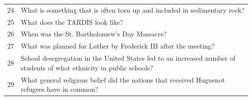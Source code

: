 \begin{tabular}{ll}
24 & What is something that is often torn up and included in sedimentary rock? \\
25 & What does the TARDIS look like? \\
26 & When was the St. Bartholomew's Day Massacre? \\
27 & What was planned for Luther by Frederick III after the meeting? \\
28 & School desegregation in the United States led to an increased number of students of what ethnicity in public schools? \\
29 & What general religious belief did the nations that received Huguenot refugees have in common? \\
\bottomrule
\end{tabular}
